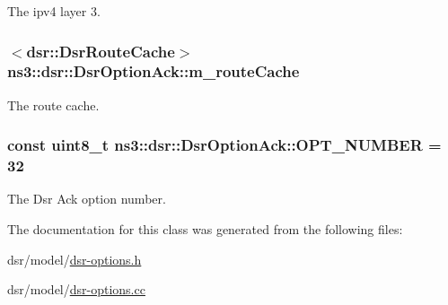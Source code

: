 The ipv4 layer 3. 

\subsubsection[{\texorpdfstring{m\+\_\+route\+Cache}{m_routeCache}}]{$<${\bf dsr\+::\+Dsr\+Route\+Cache}$>$ ns3\+::dsr\+::\+Dsr\+Option\+Ack\+::m\+\_\+route\+Cache\hspace{0.3cm}{\ttfamily [private]}}\hypertarget{classns3_1_1dsr_1_1DsrOptionAck_ac95e41faeb9d00cd66ea4d3163a95542}{}\label{classns3_1_1dsr_1_1DsrOptionAck_ac95e41faeb9d00cd66ea4d3163a95542}


The route cache. 

\subsubsection[{\texorpdfstring{O\+P\+T\+\_\+\+N\+U\+M\+B\+ER}{OPT_NUMBER}}]{\setlength{\rightskip}{0pt plus 5cm}const uint8\+\_\+t ns3\+::dsr\+::\+Dsr\+Option\+Ack\+::\+O\+P\+T\+\_\+\+N\+U\+M\+B\+ER = 32\hspace{0.3cm}{\ttfamily [static]}}\hypertarget{classns3_1_1dsr_1_1DsrOptionAck_a83238a663cdc2220dc3836e5b3d533a5}{}\label{classns3_1_1dsr_1_1DsrOptionAck_a83238a663cdc2220dc3836e5b3d533a5}


The Dsr Ack option number. 



The documentation for this class was generated from the following files\+:\begin{DoxyCompactItemize}
\item 
dsr/model/\hyperlink{dsr-options_8h}{dsr-\/options.\+h}\item 
dsr/model/\hyperlink{dsr-options_8cc}{dsr-\/options.\+cc}\end{DoxyCompactItemize}
